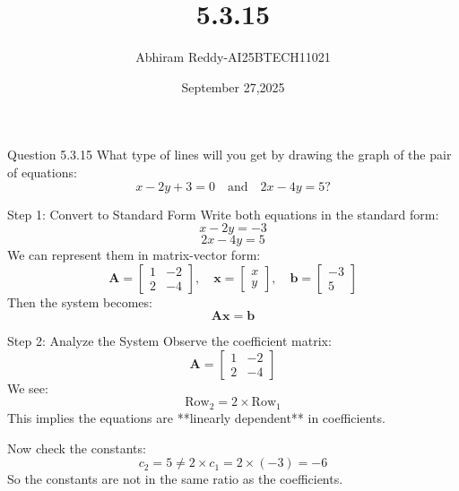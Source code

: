 \documentclass{beamer}
\title 
{5.3.15}
\date{September 27,2025}
\author 
{Abhiram Reddy-AI25BTECH11021}
\begin{document}
\frame{\titlepage}

\begin{frame}{Question 5.3.15}
What type of lines will you get by drawing the graph of the pair of equations:
\[
x - 2y + 3 = 0 \quad \text{and} \quad 2x - 4y = 5?
\]
\end{frame}

\begin{frame}{Step 1: Convert to Standard Form}
Write both equations in the standard form:
\begin{equation}
x - 2y = -3
\label{eq:1}
\end{equation}
\begin{equation}
2x - 4y = 5
\label{eq:2}
\end{equation}
We can represent them in matrix-vector form:
\begin{equation}
\mathbf{A} = \begin{bmatrix} 1 & -2 \\ 2 & -4 \end{bmatrix}, \quad
\mathbf{x} = \begin{bmatrix} x \\ y \end{bmatrix}, \quad
\mathbf{b} = \begin{bmatrix} -3 \\ 5 \end{bmatrix}
\end{equation}
Then the system becomes:
\begin{equation}
\mathbf{A} \mathbf{x} = \mathbf{b}
\end{equation}
\end{frame}

\begin{frame}{Step 2: Analyze the System}
Observe the coefficient matrix:
\[
\mathbf{A} = \begin{bmatrix} 1 & -2 \\ 2 & -4 \end{bmatrix}
\]
We see:
\begin{equation}
\text{Row}_2 = 2 \times \text{Row}_1
\end{equation}
This implies the equations are **linearly dependent** in coefficients.

Now check the constants:
\begin{equation}
c_2 = 5 \neq 2 \times c_1 = 2 \times (-3) = -6
\end{equation}
So the constants are not in the same ratio as the coefficients.
\end{frame}
\end{document}
